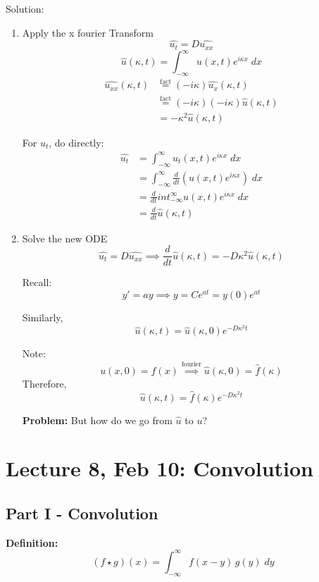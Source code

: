 \documentclass[12pt]{article}
\newcommand{\ans}[1]{\boxed{\text{#1}}}
\renewcommand{\hat}[1]{\widehat{#1}}
\begin{document}
Solution:
\begin{enumerate}
    \item Apply the x fourier Transform
    \[\hat{u_t} = D \hat{u_{xx}}\]
    \[\hat{u}(\kappa, t) = \int_{-\infty}^\infty u(x, t)e^{i\kappa x}\; dx\]
    \begin{align*}
        \widehat{u_{xx}}(\kappa, t) &\overset{\text{fact}}{=} (-i\kappa) \hat{u_x}(\kappa, t)\\
        &\overset{\text{fact}}{=} (-i\kappa)(-i\kappa) \hat{u}(\kappa, t)\\
        &= -\kappa^2 \hat{u}(\kappa, t)
    \end{align*}

    For $u_t$, do directly:
    \begin{align*}
        \hat{u_t} &= \int_{-\infty}^\infty u_t(x, t) e^{i\kappa x} \; dx \\
        &= \int_{-\infty}^\infty \frac{d}{dt}(u(x, t)e^{i\kappa x}) \; dx\\
        &= \frac{d}{dt}int_{-\infty}^\infty u(x, t)e^{i\kappa x} \; dx\\
        &= \frac{d}{dt} \hat{u}(\kappa, t)
    \end{align*}

    \item Solve the new ODE 
    \[\hat{u_t} = D\hat{u_{xx}} \implies \frac{d}{dt}\hat{u}(\kappa, t) = -D\kappa^2 \hat{u}(\kappa, t)\]
    
    Recall:
    \[y' = ay \implies y= Ce^{at} = y(0)e^{at}\]

    Similarly, 
    \[\hat{u}(\kappa, t) = \hat{u}(\kappa, 0)e^{-D\kappa^2t} \]

    Note: 
    \[u(x, 0) = f(x) \overset{\text{fourier}}{\implies} \hat{u}(\kappa, 0) = \hat{f}(\kappa)\]
    Therefore, 
    \[\ans{$\hat{u}(\kappa, t) = \hat{f}(\kappa)e^{-D\kappa^2t}$}\]

    \textbf{Problem:} But how do we go from $\hat{u}$ to $u$?
\end{enumerate}

\section*{Lecture 8, Feb 10: Convolution}
\subsection*{Part I - Convolution}
\textbf{Definition:}
\[(f \star g)(x) = \int_{-\infty}^\infty f(x - y)\, g(y)\; dy\]
\end{document}
